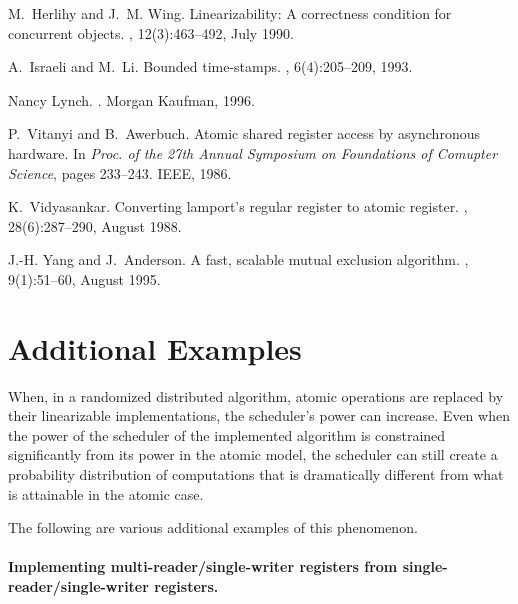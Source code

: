 \documentclass[11pt,letterpaper]{article}
\begin{document}
\begin{thebibliography}{GHHW07}
M.~Herlihy and J.~M. Wing.
\newblock Linearizability: A correctness condition for concurrent objects.
, 12(3):463--492, July 1990.

A.~Israeli and M.~Li.
\newblock Bounded time-stamps.
, 6(4):205--209, 1993.

Nancy Lynch.
.
\newblock Morgan Kaufman, 1996.

P.~Vitanyi and B.~Awerbuch.
\newblock Atomic shared register access by asynchronous hardware.
\newblock In {\em Proc. of the 27th Annual Symposium on Foundations of Comupter
  Science}, pages 233--243. IEEE, 1986.

K.~Vidyasankar.
\newblock Converting lamport's regular register to atomic register.
, 28(6):287--290, August 1988.

J.-H. Yang and J.~Anderson.
\newblock A fast, scalable mutual exclusion algorithm.
, 9(1):51--60, August 1995.

\end{thebibliography}


\newpage
\appendix

\let\appsection\section

\appsection{Additional Examples}
\label{sec-appendix-examples}

When, in a randomized distributed algorithm,
atomic operations are replaced by their linearizable implementations,
the scheduler's power can increase.
Even when the power of the scheduler of the implemented algorithm is constrained significantly from its
power in the atomic model, the scheduler can still create a probability distribution of computations that
is dramatically different from what is attainable in the atomic case.

The following are various additional examples of this phenomenon.

\paragraph{Implementing multi-reader/single-writer registers from single-reader/single-writer registers.}
\end{document}
